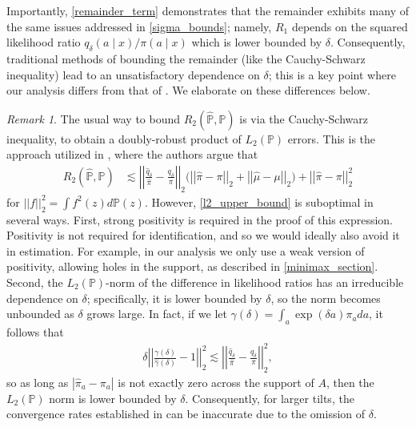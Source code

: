 \documentclass[11pt,twoside]{article}
\newcommand{\Pb}{\mathbb{P}}
\theoremstyle{definition}
\theoremstyle{remark}
\newtheorem{remark}{Remark}
\begin{document}
Importantly, \cref{remainder_term} demonstrates that the remainder exhibits many of the same issues addressed in \cref{sigma_bounds}; namely, $R_1$ depends on the squared likelihood ratio ${q_\delta(a \mid x)}/{\pi(a \mid x)}$ which is lower bounded by $\delta$. Consequently,  traditional methods of bounding the remainder (like the Cauchy-Schwarz inequality) lead to an unsatisfactory dependence on $\delta$; this is a key point where our  analysis differs from that of \cite{diaz2020causal}. We elaborate on these differences below.
\begin{remark} \label{rem:csbd}
    The usual way to bound $R_2(\widehat{\mathbb{P}}, \mathbb{P})$ is via the Cauchy-Schwarz inequality, to obtain a doubly-robust product of $L_2(\Pb)$ errors. This is the approach utilized in \cite{diaz2020causal}, where the authors argue that
\begin{align} \label{l2_upper_bound}
    R_2(\widehat{\mathbb{P}}, \mathbb{P}) &\lesssim \left| \left| \frac{\widehat{q}_\delta}{\widehat{\pi}} - \frac{q_\delta}{\pi} \right| \right|_2 \Big( \left| \left| \widehat{\pi} - \pi \right| \right|_2 + \left| \left| \widehat{\mu} - \mu \right| \right|_2\Big) + \left| \left| \widehat{\pi} - \pi \right| \right|^2_2
\end{align}
for $||f||^2_2 = \int f^2(z) d \mathbb{P}(z)$. However, \cref{l2_upper_bound} is suboptimal in several ways. First, strong positivity is required in the proof of this expression. Positivity is not required for identification, and so we would ideally also avoid it in estimation. For example, in our analysis we only use a weak version of positivity, allowing holes in the support, as described in \cref{minimax_section}. Second, the $L_2(\mathbb{P})$-norm of the difference in likelihood ratios has an irreducible dependence on $\delta$; specifically, it is lower bounded by $\delta$, so the norm becomes unbounded as $\delta$ grows large. In fact, if we let $\gamma(\delta) = \int_a \exp(\delta a)\pi_a da$, it follows that
\begin{align} \label{l2_lower_bound}
    \delta  \left| \left| \frac{\gamma(\delta) }{\widehat{\gamma}(\delta)} - 1 \right| \right|^2_2 \lesssim \left| \left| \frac{\widehat{q}_\delta}{\widehat{\pi}} - \frac{q_\delta}{\pi} \right| \right|^2_2,
\end{align}
so as long as $|\widehat{\pi}_a - \pi_a|$ is not exactly zero across the support of $A$, then the $L_2(\mathbb{P})$ norm is lower bounded by $\delta$. Consequently, for larger tilts, the convergence rates established in \cite{diaz2020causal} can be inaccurate due to the omission of $\delta$.
\end{remark}
\end{document}
